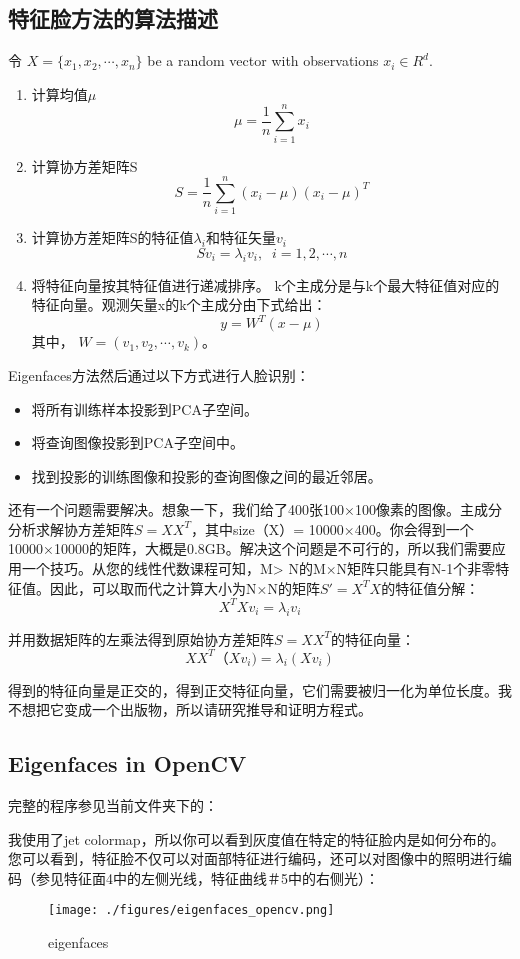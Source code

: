 \documentclass[UTF8]{ctexart}
\begin{document}
\subsection{特征脸方法的算法描述}
令 $X=\{x_1,x_2,\cdots,x_n\}$ be a random vector with observations $x_i \in R^d$.
\begin{enumerate}
    	\item 计算均值$\mu$
   		 $$ \mu = \frac{1}{n}\sum_{i = 1}^{n}x_i$$ 
   	 \item 计算协方差矩阵S
   		$$ S = \frac{1}{n}\sum_{i=1}^n (x_i−\mu)(x_i−\mu)^T $$ 
    	\item 计算协方差矩阵S的特征值$\lambda_i$和特征矢量$v_i$
		$$ Sv_i=\lambda_iv_i, \; \; i=1,2,\cdots,n $$ 
    	\item 将特征向量按其特征值进行递减排序。 k个主成分是与k个最大特征值对应的特征向量。观测矢量x的k个主成分由下式给出：
		$$ y = W^T(x−\mu)$$
	其中， $W=(v_1,v_2,\cdots,v_k)$。
\end{enumerate}

Eigenfaces方法然后通过以下方式进行人脸识别：
\begin{itemize}
    	\item 将所有训练样本投影到PCA子空间。
    	\item 将查询图像投影到PCA子空间中。
    	\item 找到投影的训练图像和投影的查询图像之间的最近邻居。
\end{itemize}

还有一个问题需要解决。想象一下，我们给了400张100×100像素的图像。主成分分析求解协方差矩阵$S = XX^T$，其中size（X）= 10000×400。你会得到一个10000×10000的矩阵，大概是0.8GB。解决这个问题是不可行的，所以我们需要应用一个技巧。从您的线性代数课程可知，M> N的M×N矩阵只能具有N-1个非零特征值。因此，可以取而代之计算大小为N×N的矩阵$S' = X^TX$的特征值分解：
$$X^TXv_i = \lambda_iv_i$$

并用数据矩阵的左乘法得到原始协方差矩阵$S = XX^T$的特征向量：
$$XX^T（Xv_i) = \lambda_i(Xv_i)$$

得到的特征向量是正交的，得到正交特征向量，它们需要被归一化为单位长度。我不想把它变成一个出版物，所以请研究\cite{Duda2000}推导和证明方程式。

\subsection{Eigenfaces in OpenCV}
完整的程序参见当前文件夹下的：{\color{blue}{facerec\_eigenfaces.cpp}}

我使用了jet colormap，所以你可以看到灰度值在特定的特征脸内是如何分布的。 您可以看到，特征脸不仅可以对面部特征进行编码，还可以对图像中的照明进行编码（参见特征面4中的左侧光线，特征曲线＃5中的右侧光）：
\begin{figure}[htbp]
	\centerline{\texttt{[image: ./figures/eigenfaces\_opencv.png]}}
	\caption{eigenfaces}
\end{figure}
\end{document}
